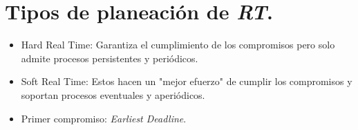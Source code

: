 \section{Tipos de planeaci\'{o}n de \textit{RT}.}
\begin{itemize}
	\item Hard Real Time: Garantiza el cumplimiento de los compromisos pero solo admite procesos persistentes y peri\'{o}dicos.
	\item Soft Real Time: Estos hacen un "mejor efuerzo" de cumplir los compromisos y soportan procesos eventuales y aperi\'{o}dicos.
	\item Primer compromiso: \textit{Earliest Deadline}.
\end{itemize}
